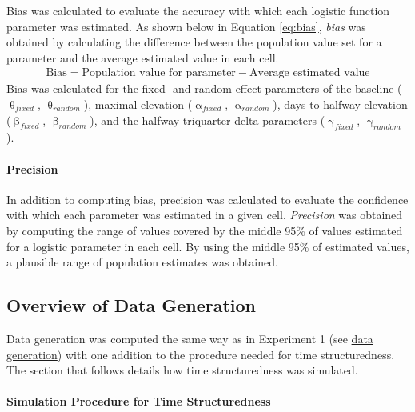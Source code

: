 \documentclass[
12pt, %
twoside,
english]{guelphthesis}
\begin{document}
Bias was calculated to evaluate the accuracy with which each logistic
function parameter was estimated. As shown below in Equation
\eqref{eq:bias}, \emph{bias} was obtained by calculating the difference
between the population value set for a parameter and the average
estimated value in each cell.
\begin{align}
  \text{Bias} =  \text{Population value for parameter} - \text{Average estimated value}
  \label{eq:bias} 
\end{align}
\noindent Bias was calculated for the fixed- and random-effect parameters of the baseline (\(\uptheta_{fixed}\), \(\uptheta_{random}\)), maximal elevation (\(\upalpha_{fixed}\), \(\upalpha_{random}\)), days-to-halfway elevation (\(\upbeta_{fixed}\), \(\upbeta_{random}\)), and the halfway-triquarter delta parameters (\(\upgamma_{fixed}\), \(\upgamma_{random}\)).

\hypertarget{precision-1}{%
\paragraph{Precision}\label{precision-1}}

In addition to computing bias, precision was calculated to evaluate the confidence with which each parameter was estimated in a given cell. \emph{Precision} was obtained by computing the range of values covered by the middle 95\% of values estimated for a logistic parameter in each cell. By using the middle 95\% of estimated values, a plausible range of population estimates was obtained.

\hypertarget{overview-of-data-generation-1}{%
\subsection{Overview of Data Generation}\label{overview-of-data-generation-1}}

Data generation was computed the same way as in Experiment 1 (see \protect\hyperlink{data-generation}{data generation}) with one addition to the procedure needed for time structuredness. The section that follows details how time structuredness was simulated.

\hypertarget{simulation-procedure-for-time-structuredness}{%
\paragraph{Simulation Procedure for Time Structuredness}\label{simulation-procedure-for-time-structuredness}}
\end{document}
